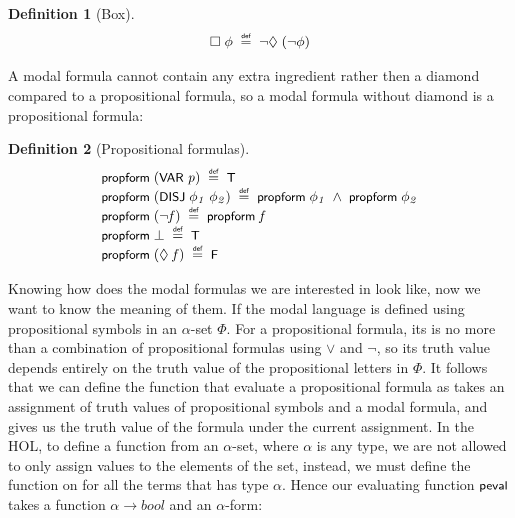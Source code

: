 \documentclass[letterpaper]{article}
\newtheorem{defn}{Definition}
\renewcommand{\HOLConst}[1]{{\textsf{\upshape\small #1}}}
\renewcommand{\HOLinline}[1]{\ensuremath{#1}}
\newenvironment{holmath}{\begin{displaymath}\begin{array}{l}}{\end{array}\end{displaymath}\ignorespacesafterend}
\begin{document}
\begin{defn}[Box]
\begin{holmath}
  \HOLSymConst{\ensuremath{\Box}}\;\HOLFreeVar{\ensuremath{\phi}}\;\HOLSymConst{\HOLTokenDefEquality{}}\;\HOLSymConst{\HOLTokenNeg{}}\HOLSymConst{\ensuremath{\Diamond}}\;(\HOLSymConst{\HOLTokenNeg{}}\HOLFreeVar{\ensuremath{\phi}})
\end{holmath}
\end{defn}

A modal formula cannot contain any extra ingredient rather then a diamond compared to a propositional formula, so a modal formula without diamond is a propositional formula:

\begin{defn}[Propositional formulas]
\begin{holmath}
  \HOLConst{propform}\;(\HOLConst{VAR}\;\HOLFreeVar{p})\;\HOLSymConst{\HOLTokenDefEquality{}}\;\HOLConst{T}\\
\HOLConst{propform}\;(\HOLConst{DISJ}\;\HOLFreeVar{\ensuremath{\phi\sb{1}}}\;\HOLFreeVar{\ensuremath{\phi\sb{2}}})\;\HOLSymConst{\HOLTokenDefEquality{}}\;\HOLConst{propform}\;\HOLFreeVar{\ensuremath{\phi\sb{1}}}\;\HOLSymConst{\HOLTokenConj{}}\;\HOLConst{propform}\;\HOLFreeVar{\ensuremath{\phi\sb{2}}}\\
\HOLConst{propform}\;(\HOLSymConst{\HOLTokenNeg{}}\HOLFreeVar{f})\;\HOLSymConst{\HOLTokenDefEquality{}}\;\HOLConst{propform}\;\HOLFreeVar{f}\\
\HOLConst{propform}\;\HOLSymConst{\ensuremath{\bot}}\;\HOLSymConst{\HOLTokenDefEquality{}}\;\HOLConst{T}\\
\HOLConst{propform}\;(\HOLSymConst{\ensuremath{\Diamond}}\;\HOLFreeVar{f})\;\HOLSymConst{\HOLTokenDefEquality{}}\;\HOLConst{F}
\end{holmath}
\end{defn}

Knowing how does the modal formulas we are interested in look like, now we want to know the meaning of them. If the modal language is defined using propositional symbols in an $\alpha$-set $\Phi$. For a propositional formula, its is no more than a combination of propositional formulas using $\lor$ and $\lnot$, so its truth value depends entirely on the truth value of the propositional letters in $\Phi$. It follows that we can define the function that evaluate a propositional formula as takes an assignment of truth values of propositional symbols and a modal formula, and gives us the truth value of the formula under the current assignment. In the HOL, to define a function from an $\alpha$-set, where $\alpha$ is any type, we are not allowed to only assign values to the elements of the set, instead, we must define the function on for all the terms that has type $\alpha$. Hence our evaluating function \HOLinline{\HOLConst{peval}} takes a function $\alpha\to bool$ and an $\alpha$-form:
\end{document}
